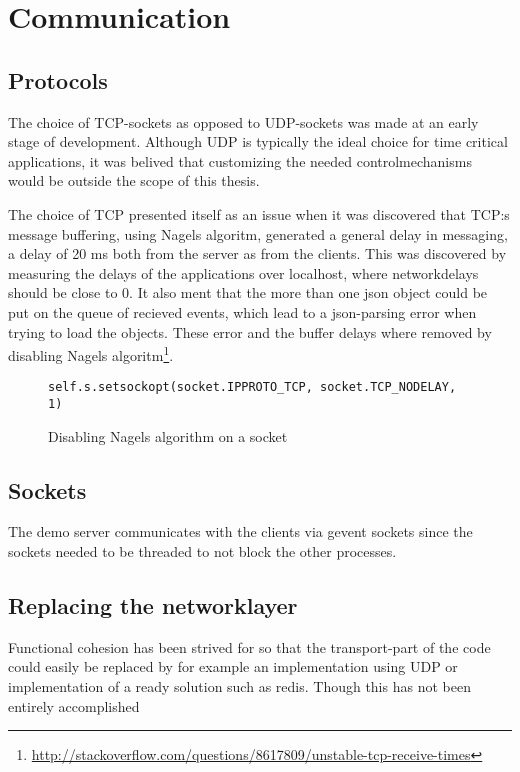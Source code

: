 \section{Communication}

\subsection{Protocols}
The choice of TCP-sockets as opposed to UDP-sockets was made at an early stage of development. Although UDP is typically the ideal choice for time critical applications, it was belived that customizing the needed controlmechanisms would be outside the scope of this thesis. 

The choice of TCP presented itself as an issue when it was discovered that TCP:s message buffering, using Nagels algoritm, generated a general delay in messaging, a delay of 20 ms both from the server as from the clients. This was discovered by measuring the delays of the applications over localhost, where networkdelays should be close to 0. It also ment that the more than one json object could be put on the queue of recieved events, which lead to a json-parsing error when trying to load the objects. These error and the buffer delays where removed by disabling Nagels algoritm\footnote{\url{http://stackoverflow.com/questions/8617809/unstable-tcp-receive-times}}.


\begin{figure}[h!]
\centering
\texttt{self.s.setsockopt(socket.IPPROTO\_TCP, socket.TCP\_NODELAY, 1)}
\caption{Disabling Nagels algorithm on a socket}
\end{figure}

\subsection{Sockets}
The demo server communicates with the clients via gevent sockets since the sockets needed to be threaded to not block the other processes. 


\subsection{Replacing the networklayer}
Functional cohesion has been strived for so that the transport-part of the code could easily be replaced by for example an implementation using UDP or implementation of a ready solution such as redis. Though this has not been entirely accomplished %




